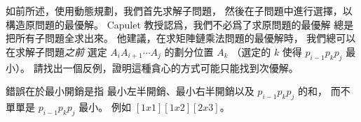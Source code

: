 \startEXERCISE
如前所述，使用動態規劃，我們首先求解子問題，
然後在子問題中進行選擇，以構造原問題的最優解。
 Capulet 教授認爲，我們不必爲了求原問題的最優解
總是把所有子問題全求出來。
他建議，在求矩陣鏈乘法問題的最優解時，
我們總可以在求解子問題\emph{之前}
選定 $A_i A_{i+1}\cdots A_j$ 的劃分位置 $A_k$
（選定的 $k$ 使得 $p_{i-1} p_k p_j$ 最小）。
請找出一個反例，證明這種貪心的方式可能只能找到次優解。
\stopEXERCISE

\startANSWER
錯誤在於最小開銷是指
最小左半開銷、最小右半開銷以及 $p_{i-1} p_k p_j$ 的和，
而不單單是 $p_{i-1} p_k p_j$ 最小。
例如 $[1x1][1x2][2x3]$。
\stopANSWER

